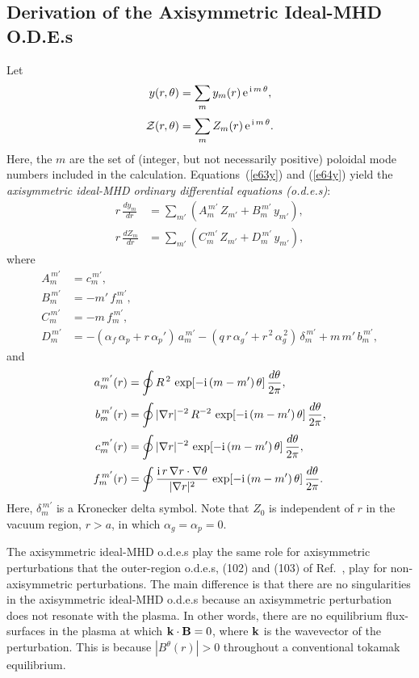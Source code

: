 \documentclass[12pt,prb,aps]{revtex4-1}
\begin{document}
\subsection{Derivation of the Axisymmetric Ideal-MHD O.D.E.s}\label{ode}
Let
\begin{align}\label{e62s}
y(r,\theta)&= \sum_m y_m(r)\,{\rm e}^{\,{\rm i}\,m\,\theta},\\[0.5ex]
{\cal Z}(r,\theta) &= \sum_m Z_m(r)\,{\rm e}^{\,{\rm i}\,m\,\theta}.\label{e63s}
\end{align}
Here, the $m$ are the set of (integer, but not necessarily positive) poloidal mode numbers included in the calculation. 
Equations~(\ref{e63y}) and (\ref{e64y}) yield the {\em axisymmetric ideal-MHD ordinary differential equations (o.d.e.s)}:
\begin{align}\label{e69u}
r\,\frac{dy_m}{dr}&= \sum_{m'}\left(A_{m}^{\,m'}\,Z_{m'} + B_{m}^{\,m'}\,y_{m'}\right),\\[0.5ex]
r\,\frac{dZ_m}{dr}&= \sum_{m'}\left(C_{m}^{\,m'}\,Z_{m'} + D_{m}^{\,m'}\,y_{m'}\right),\label{e70uu}
\end{align}
where
\begin{align}
A_m^{\,m'} &= c_{m}^{\,m'},\\[0.5ex]
B_m^{\,m'} &= - m'\,f_m^{\,m'},\\[0.5ex]
C_{m}^{\,m'} &= -m\,f_m^{\,m'},\\[0.5ex]
D_{m}^{\,m'}&= -(\alpha_f\,\alpha_p+ r\,\alpha_p')\,a_m^{\,m'} - (q\,r\,\alpha_g' +r^{\,2}\,\alpha_g^{\,2})\,\delta_m^{\,m'}+m\,m'\,b_m^{\,m'},\label{Ddef}
\end{align}
and
\begin{align}\label{e73er}
a_m^{\,m'}(r)  &=\oint R^{\,2}\,\exp[-{\rm i}\,(m-m')\,\theta]\,\frac{d\theta}{2\pi},\\[0.5ex]
b_m^{\,m'}(r)  &=\oint|\nabla r|^{-2}\, R^{-2}\,\exp[-{\rm i}\,(m-m')\,\theta]\,\frac{d\theta}{2\pi},\\[0.5ex]
c_m^{\,m'}(r)  &=\oint|\nabla r|^{-2}\,\exp[-{\rm i}\,(m-m')\,\theta]\,\frac{d\theta}{2\pi},\\[0.5ex]
f_{m}^{\,m'}(r)&= \oint \frac{{\rm i}\,r\,\nabla r\cdot\nabla\theta}{|\nabla r|^2}\,\exp[-{\rm i}\,(m-m')\,\theta]\,\frac{d\theta}{2\pi}.\label{e76er}
\end{align}
Here, $\delta_m^{\,m'}$ is a Kronecker delta symbol. Note that $Z_0$ is independent of $r$ in the vacuum region, $r>a$,  in which
$\alpha_g=\alpha_p=0$. 

The axisymmetric ideal-MHD o.d.e.s play the same role for axisymmetric perturbations that the outer-region o.d.e.s, (102) and (103) of Ref.~, play for
non-axisymmetric perturbations. The main difference is that there are no singularities in the axisymmetric ideal-MHD o.d.e.s because an axisymmetric perturbation 
does not resonate with the plasma. In other words, there are no equilibrium flux-surfaces in the plasma at which ${\bf k}\cdot{\bf B}=0$, where ${\bf k}$ is the
wavevector of the perturbation. This is because $|B^\theta(r)|>0$ throughout a conventional tokamak equilibrium. 
\end{document}
